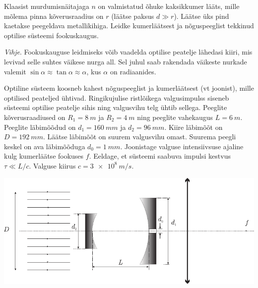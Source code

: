 \documentclass[10pt, twoside]{article}
\begin{document}
{%

Klaasist murdumisnäitajaga $n$ on valmistatud õhuke kaksikkumer lääts, mille mõlema pinna kõverusraadius on $r$ (läätse paksus
$d \gg r$). Läätse üks pind kaetakse peegeldava metallikihiga. Leidke kumerläätsest ja nõguspeeglist tekkinud optilise süsteemi fookuskaugus. 

\emph{Vihje}. Fookuskauguse leidmiseks võib vaadelda optilise peatelje lähedasi kiiri, mis levivad
selle suhtes väikese nurga all. Sel juhul saab rakendada väikeste nurkade valemit $\sin \alpha \approx \tan \alpha \approx \alpha$, kus $\alpha$ on radiaanides.
\probend
\bigskip


Optiline süsteem koosneb kahest nõguspeeglist ja kumerläätsest (vt joonist), mille optilised peateljed ühtivad. Ringikujulise ristlõikega valgusimpulss siseneb süsteemi optilise peatelje sihis ning valgusvihu telg ühtib sellega. Peeglite kõverusraadiused on $R_1 = \SI{8}{m}$ ja $R_2 = \SI{4}{m}$ ning peeglite vahekaugus $L = \SI{6}{m}$. Peeglite läbimõõdud on $d_1 = \SI{160}{mm}$ ja $d_2 = \SI{96}{mm}$. Kiire läbimõõt on $D = \SI{192}{mm}$. Läätse läbimõõt on suurem valgusvihu omast. Suurema peegli keskel on ava läbimõõduga $d_0 = \SI{1}{mm}$. Joonistage valguse intensiivsuse ajaline kulg kumerläätse fookuses $f$. Eeldage, et süsteemi saabuva impulsi kestvus $\tau \ll L/c$. Valguse kiirus $c = \SI{3e8}{m/s}$.

\begin{center}
	\includegraphics[width=0.95\linewidth]{2006-v3g-09-yl}
\end{center}
\probend
\bigskip
\newpage\subsection{\protect{}}

}
\end{document}
